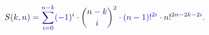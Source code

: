 \documentclass[12pt]{article}
\begin{document}
\makeatletter
\renewcommand*{\@textcolor}[3]{%
  \protect\leavevmode
  \begingroup
    \color#1{#2}#3%
  \endgroup
}
\makeatother
\begin{displaymath}
\mathcolor[RGB]{0,0,15}{S} \mathcolor[RGB]{0,0,30}{(} \mathcolor[RGB]{0,0,45}{k} \mathcolor[RGB]{0,0,60}{,} \mathcolor[RGB]{0,0,75}{n} \mathcolor[RGB]{0,0,90}{)} \mathcolor[RGB]{0,0,105}{=} \mathcolor[RGB]{0,0,120}{\sum} _ { \mathcolor[RGB]{0,0,135}{i} \mathcolor[RGB]{0,0,150}{=} \mathcolor[RGB]{0,0,165}{0} } ^ { \mathcolor[RGB]{0,0,180}{n} \mathcolor[RGB]{0,0,195}{-} \mathcolor[RGB]{0,0,210}{k} } \mathcolor[RGB]{0,0,225}{(} \mathcolor[RGB]{0,0,240}{-} \mathcolor[RGB]{0,0,255}{1} \mathcolor[RGB]{0,15,0}{)} ^ { \mathcolor[RGB]{0,15,15}{i} } \mathcolor[RGB]{0,15,30}{\cdot} \mathcolor[RGB]{0,15,45}{\binom { \mathcolor[RGB]{0,15,60}{n} \mathcolor[RGB]{0,15,75}{-} \mathcolor[RGB]{0,15,90}{k} } { \mathcolor[RGB]{0,15,105}{i} } } ^ { \mathcolor[RGB]{0,15,120}{2} } \mathcolor[RGB]{0,15,135}{\cdot} \mathcolor[RGB]{0,15,150}{(} \mathcolor[RGB]{0,15,165}{n} \mathcolor[RGB]{0,15,180}{-} \mathcolor[RGB]{0,15,195}{1} \mathcolor[RGB]{0,15,210}{)} \mathcolor[RGB]{0,15,225}{!} ^ { \mathcolor[RGB]{0,15,240}{2} \mathcolor[RGB]{0,15,255}{i} } \mathcolor[RGB]{0,30,0}{\cdot} \mathcolor[RGB]{0,30,15}{n} \mathcolor[RGB]{0,30,30}{!} ^ { \mathcolor[RGB]{0,30,45}{2} \mathcolor[RGB]{0,30,60}{n} \mathcolor[RGB]{0,30,75}{-} \mathcolor[RGB]{0,30,90}{2} \mathcolor[RGB]{0,30,105}{k} \mathcolor[RGB]{0,30,120}{-} \mathcolor[RGB]{0,30,135}{2} \mathcolor[RGB]{0,30,150}{i} } \mathcolor[RGB]{0,30,165}{.}
\end{displaymath}
\end{document}
